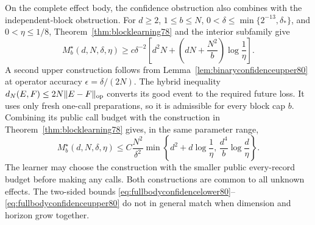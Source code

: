 On the complete effect body, the confidence obstruction also
combines with the independent-block obstruction.  For $d\ge2$,
$1\le b\le N$, $0<\delta\le\min\{2^{-13},\delta_*\}$, and
$0<\eta\le1/8$, Theorem~\ref{thm:blocklearning78} and the
interior subfamily give
\begin{equation}\label{eq:fullbodyconfidencelower80}
 M_b^\star(d,N,\delta,\eta)
 \ge c\delta^{-2}
       \left[d^2N+\left(dN+\frac{N^2}{b}\right)\log\frac1\eta\right].
\end{equation}
A second upper construction follows from
Lemma~\ref{lem:binaryconfidenceupper80} at operator accuracy
$\epsilon=\delta/(2N)$.  The hybrid inequality
$d_N(E,F)\le2N\|E-F\|_{\rm op}$ converts its good event to the
required future loss.  It uses only fresh one-call preparations,
so it is admissible for every block cap $b$.  Combining its public
call budget with the construction in
Theorem~\ref{thm:blocklearning78} gives, in the same parameter range,
\begin{equation}\label{eq:fullbodyconfidenceupper80}
 M_b^\star(d,N,\delta,\eta)
 \le C\frac{N^2}{\delta^2}
       \min\left\{d^2+d\log\frac1\eta,\,
                    \frac{d^4}{b}\log\frac d\eta\right\}.
\end{equation}
The learner may choose the construction with the smaller public
every-record budget before making any calls.  Both constructions
are common to all unknown effects.  The two-sided bounds
\eqref{eq:fullbodyconfidencelower80}--\eqref{eq:fullbodyconfidenceupper80}
do not in general match when dimension and horizon grow together.


